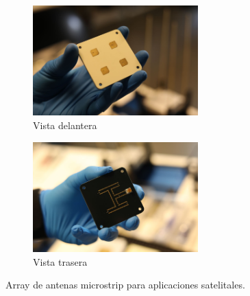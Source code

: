 \begin{figure}[h]
     \centering
     \begin{subfigure}[b]{\textwidth}
         \centering
         \includegraphics[width=0.7\textwidth]{archivos/enduro1}
         \caption{Vista delantera}
         \label{fig:endur1}
     \end{subfigure}
\vfill
     \begin{subfigure}[b]{\textwidth}
         \centering
         \includegraphics[width=0.7\textwidth]{archivos/enduro2}
         \caption{Vista trasera}
         \label{fig:endur2}
     \end{subfigure}

        \caption{Array de antenas microstrip para aplicaciones satelitales. \cite{Endurosat2018}}
        \label{fig:endur}
\end{figure}
\vfill
